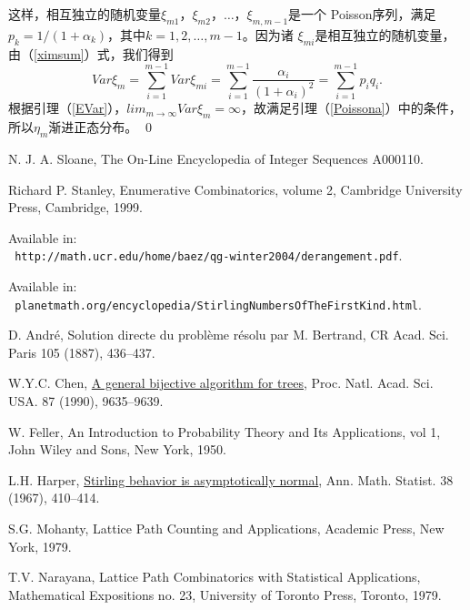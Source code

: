 这样，相互独立的随机变量$\xi_{m1}$，$\xi_{m2}$，$\ldots$，$\xi_{m,m-1}$是一个
Poisson序列，满足$p_k=1/(1+\alpha_k)$，其中$k=1,2,\ldots,m-1$。因为诸
$\xi_{mi}$是相互独立的随机变量，由（\ref{ximsum}）式，我们得到
\[
Var\xi_m=\sum\limits_{i=1}^{m-1}Var\xi_{mi}=\sum\limits_{i=1}^{m-1}\frac{\alpha_i}
{(1+\alpha_i)^2}=\sum\limits_{i=1}^{m-1}p_iq_i.
\]
根据引理（\ref{EVar}），$lim_{m\rightarrow
\infty}Var\xi_m=\infty$，故满足引理（\ref{Poissona}）中的条件，所以$\eta_m$渐进正态分布。
\qed










% 
\begin{thebibliography}{99}



 N. J. A. Sloane, The On-Line Encyclopedia of Integer Sequences A000110.

 Richard P. Stanley, Enumerative Combinatorics,
 volume 2, Cambridge
University Press, Cambridge, 1999.

 Available in:\\ {\tt
http://math.ucr.edu/home/baez/qg-winter2004/derangement.pdf}.

 Available in:\\ {\tt
planetmath.org/encyclopedia/StirlingNumbersOfTheFirstKind.html}.

 D. Andr\'e,
Solution directe du probl\`eme r\'esolu par M. Bertrand, CR Acad.
Sci. Paris 105 (1887), 436--437.

 W.Y.C. Chen,
\href{ref/A general bijective algorithm for trees.pdf}{A general
bijective algorithm for trees}, Proc. Natl. Acad. Sci. USA. 87
(1990), 9635--9639.

 W. Feller,
An Introduction to Probability Theory and Its Applications, vol 1,
John Wiley and Sons, New York, 1950.

 L.H. Harper, \href{ref/Stirling behavior is asymptotically
 normal.pdf}
{Stirling behavior is asymptotically normal}, Ann. Math. Statist. 38
(1967), 410--414.

 S.G. Mohanty, Lattice Path Counting and Applications,
Academic Press, New York, 1979.

 T.V. Narayana,
Lattice Path Combinatorics with Statistical Applications,
Mathematical Expositions no. 23, University of Toronto Press,
Toronto, 1979.


\end{thebibliography}
